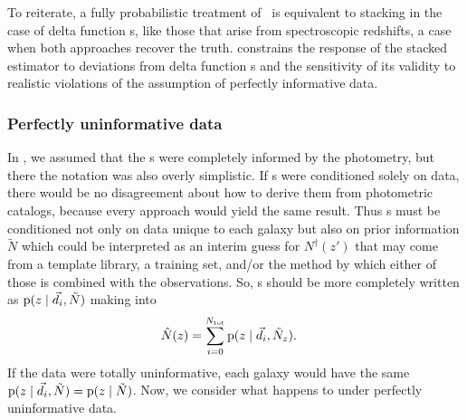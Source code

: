 
To reiterate, a fully probabilistic treatment of \Nz\ is equivalent to stacking in the case of delta function \pzpdf s, like those that arise from spectroscopic redshifts, a case when both approaches recover the truth.
 constrains the response of the stacked estimator to deviations from delta function \pzpdf s and the sensitivity of its validity to realistic violations of the assumption of perfectly informative data.


\subsubsection{Perfectly uninformative data}

In , we assumed that the \pzpdf s were completely informed by the photometry, but there the notation was also overly simplistic.
If \pzpdf s were conditioned solely on data, there would be no disagreement about how to derive them from photometric catalogs, because every approach would yield the same result.
Thus \pzpdf s must be conditioned not only on data unique to each galaxy but also on prior information $\tilde{N}$ which could be interpreted as an interim guess for $N^{\dagger}(z')$ that may come from a template library, a training set, and/or the method by which either of those is combined with the observations.
So, \pzpdf s should be more completely written as $\mathrm{p}(z \mid \vec{d}_{i}, \tilde{N})$ making  into
\begin{align}
\eqlabel{eqn:stackwithprior}
\hat{N}(z) &= \sum_{i = 0}^{\ntot} \pr{z \gvn \data_{i}, \tilde{N}_{z}} .
\end{align}
If the data were totally uninformative, each galaxy would have the same $\mathrm{p}(z \mid \vec{d}_{i}, \tilde{N}) = \mathrm{p}(z \mid \tilde{N})$.
Now, we consider what happens to  under perfectly uninformative data.

